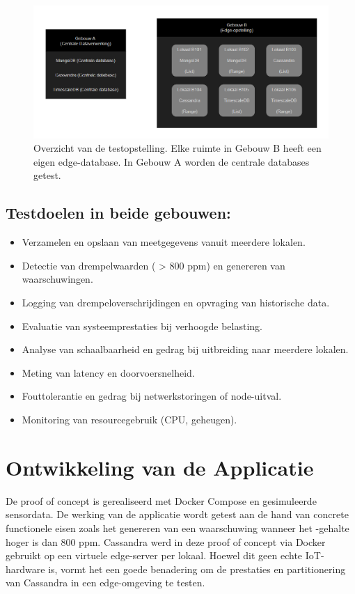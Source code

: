 \begin{figure}[H]
  \centering
  \includegraphics[width=\textwidth]{SchemaPoC.png}
  \caption{Overzicht van de testopstelling. Elke ruimte in Gebouw B heeft een eigen edge-database. In Gebouw A worden de centrale databases getest.}
  \label{fig:school-architectuur}
\end{figure}

\subsection{Testdoelen in beide gebouwen:}
\begin{itemize}
    \item Verzamelen en opslaan van meetgegevens vanuit meerdere lokalen.
    \item Detectie van drempelwaarden ( > 800 ppm) en genereren van waarschuwingen.
    \item Logging van drempeloverschrijdingen en opvraging van historische data.
    \item Evaluatie van systeemprestaties bij verhoogde belasting.
    \item Analyse van schaalbaarheid en gedrag bij uitbreiding naar meerdere lokalen.
    \item Meting van latency en doorvoersnelheid.
    \item Fouttolerantie en gedrag bij netwerkstoringen of node-uitval.
    \item Monitoring van resourcegebruik (CPU, geheugen).
\end{itemize}

\section{Ontwikkeling van de Applicatie}

De proof of concept is gerealiseerd met Docker Compose en gesimuleerde sensordata. De werking van de applicatie wordt getest aan de hand van concrete functionele eisen zoals het genereren van een waarschuwing wanneer het -gehalte hoger is dan 800 ppm.
Cassandra werd in deze proof of concept via Docker gebruikt op een virtuele edge-server per lokaal. Hoewel dit geen echte IoT-hardware is, vormt het een goede benadering om de prestaties en partitionering van Cassandra in een edge-omgeving te testen.


